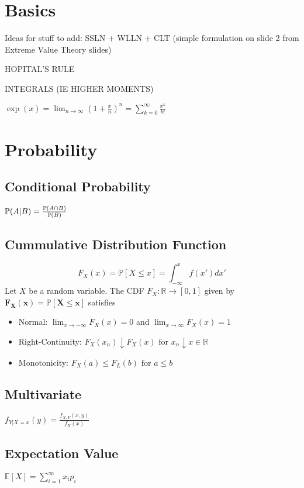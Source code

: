 \section*{Basics}

Ideas for stuff to add: SSLN + WLLN + CLT (simple formulation on slide 2 from Extreme Value Theory slides)

HOPITAL'S RULE

INTEGRALS (IE HIGHER MOMENTS)

$\exp(x)=\lim_{n\rightarrow \infty} (1+\frac{x}{n})^n=\sum^\infty_{k=0}\frac{x^k}{k!}$



\section*{Probability}
\subsection*{Conditional Probability}
$\mathbb{P}(A|B) = \frac{\mathbb{P}(A\cap B)}{\mathbb{P}(B)}$

\subsection*{Cummulative Distribution Function}
\[
    F_X(x) = \mathbb{P}[X \leq x] = \int_{-\infty}^x f(x') dx'
\]
Let $X$ be a random variable. The CDF $F_X : \mathbb{R} \to [0, 1]$ given by
$\mathbf{F_X(x) = \mathbb{P}[X \leq x]}$ satisfies
\begin{itemize}
\item Normal: $\lim_{x \to -\infty} F_X(x) = 0$ and
    $\lim_{x \to \infty}F_X(x) = 1$
\item Right-Continuity: $F_X(x_n) \downarrow F_X(x) \text{ for } x_n
  \downarrow x \in \mathbb{R}$
\item Monotonicity: $F_X(a) \leq F_L(b) \text{ for } a \leq b$
\end{itemize}

\subsection*{Multivariate}
$f_{Y|X=x}(y)=\frac{f_{X,Y}(x,y)}{f_X(x)}$

\subsection*{Expectation Value}
$\mathbb{E}[X] = \sum_{i=1}^\infty x_i p_i$

